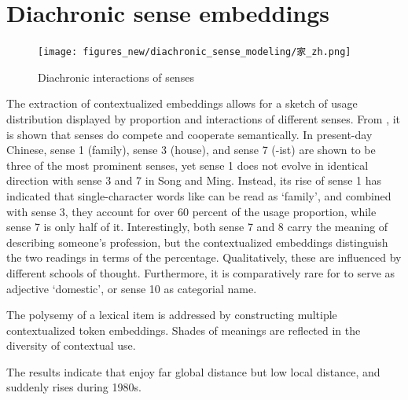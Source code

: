 \section{Diachronic sense embeddings}
\begin{figure}[H]
  \centering
  \texttt{[image: figures\_new/diachronic\_sense\_modeling/家\_zh.png]}
  \caption{Diachronic interactions of senses}
  \label{fig:jia_en}
\end{figure}

The extraction of contextualized embeddings allows for a sketch of usage distribution displayed by proportion and interactions of different senses. From , it is shown that senses do compete and cooperate semantically. In present-day Chinese, sense 1 (family), sense 3 (house), and sense 7 (-ist) are shown to be three of the most prominent senses, yet sense 1 does not evolve in identical direction with sense 3 and 7 in Song and Ming. Instead, its rise of sense 1 has indicated that single-character words like \jia can be read as `family', and combined with sense 3, they account for over 60 percent of the usage proportion, while sense 7 is only half of it. Interestingly, both sense 7 and 8 carry the meaning of describing someone's profession, but the contextualized embeddings distinguish the two readings in terms of the percentage. Qualitatively, these are influenced by different schools of thought. Furthermore, it is comparatively rare for \jia to serve as adjective `domestic', or sense 10 as categorial name.


The polysemy of a lexical item is addressed by constructing multiple contextualized token embeddings. Shades of meanings are reflected in the diversity of contextual use.

The results indicate that \jia enjoy far global distance but low local distance, and suddenly rises during 1980s.


